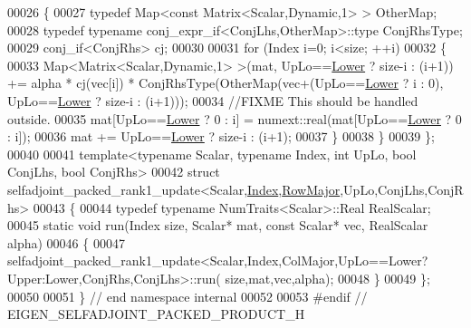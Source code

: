 \begin{DoxyCode}
00026   \{
00027     \textcolor{keyword}{typedef} Map<const Matrix<Scalar,Dynamic,1> > OtherMap;
00028     \textcolor{keyword}{typedef} \textcolor{keyword}{typename} conj\_expr\_if<ConjLhs,OtherMap>::type ConjRhsType;
00029     conj\_if<ConjRhs> cj;
00030 
00031     \textcolor{keywordflow}{for} (Index i=0; i<size; ++i)
00032     \{
00033       Map<Matrix<Scalar,Dynamic,1> >(mat, UpLo==\hyperlink{group__enums_gga39e3366ff5554d731e7dc8bb642f83cda891792b8ed394f7607ab16dd716f60e6}{Lower} ? size-i : (i+1)) += alpha * cj(vec[i]) * 
      ConjRhsType(OtherMap(vec+(UpLo==\hyperlink{group__enums_gga39e3366ff5554d731e7dc8bb642f83cda891792b8ed394f7607ab16dd716f60e6}{Lower} ? i : 0), UpLo==\hyperlink{group__enums_gga39e3366ff5554d731e7dc8bb642f83cda891792b8ed394f7607ab16dd716f60e6}{Lower} ? size-i : (i+1)));
00034       \textcolor{comment}{//FIXME This should be handled outside.}
00035       mat[UpLo==\hyperlink{group__enums_gga39e3366ff5554d731e7dc8bb642f83cda891792b8ed394f7607ab16dd716f60e6}{Lower} ? 0 : i] = numext::real(mat[UpLo==\hyperlink{group__enums_gga39e3366ff5554d731e7dc8bb642f83cda891792b8ed394f7607ab16dd716f60e6}{Lower} ? 0 : i]);
00036       mat += UpLo==\hyperlink{group__enums_gga39e3366ff5554d731e7dc8bb642f83cda891792b8ed394f7607ab16dd716f60e6}{Lower} ? size-i : (i+1);
00037     \}
00038   \}
00039 \};
00040 
00041 \textcolor{keyword}{template}<\textcolor{keyword}{typename} Scalar, \textcolor{keyword}{typename} Index, \textcolor{keywordtype}{int} UpLo, \textcolor{keywordtype}{bool} ConjLhs, \textcolor{keywordtype}{bool} ConjRhs>
00042 \textcolor{keyword}{struct }selfadjoint\_packed\_rank1\_update<Scalar,\hyperlink{namespace_eigen_a62e77e0933482dafde8fe197d9a2cfde}{Index},\hyperlink{group__enums_ggaacded1a18ae58b0f554751f6cdf9eb13acfcde9cd8677c5f7caf6bd603666aae3}{RowMajor},UpLo,ConjLhs,ConjRhs>
00043 \{
00044   \textcolor{keyword}{typedef} \textcolor{keyword}{typename} NumTraits<Scalar>::Real RealScalar;
00045   \textcolor{keyword}{static} \textcolor{keywordtype}{void} run(Index size, Scalar* mat, \textcolor{keyword}{const} Scalar* vec, RealScalar alpha)
00046   \{
00047     selfadjoint\_packed\_rank1\_update<Scalar,Index,ColMajor,UpLo==Lower?Upper:Lower,ConjRhs,ConjLhs>::run(
      size,mat,vec,alpha);
00048   \}
00049 \};
00050 
00051 \} \textcolor{comment}{// end namespace internal}
00052 
00053 \textcolor{preprocessor}{#endif // EIGEN\_SELFADJOINT\_PACKED\_PRODUCT\_H}
\end{DoxyCode}
